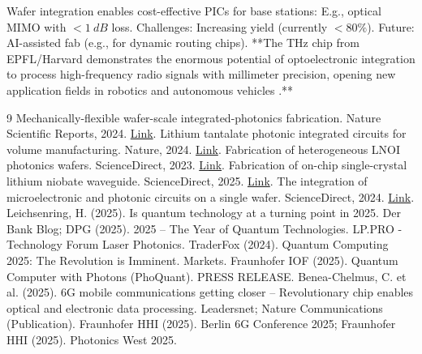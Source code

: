 	Wafer integration enables cost-effective PICs for base stations: E.g., optical MIMO with $<\SI{1}{dB}$ loss. Challenges: Increasing yield (currently $<80\%$). Future: AI-assisted fab (e.g., for dynamic routing chips). **The THz chip from EPFL/Harvard demonstrates the enormous potential of optoelectronic integration to process high-frequency radio signals with millimeter precision, opening new application fields in robotics and autonomous vehicles \cite{thz_epfl}.**
	
	\begin{thebibliography}{9}
		 Mechanically-flexible wafer-scale integrated-photonics fabrication. Nature Scientific Reports, 2024. \href{https://www.nature.com/articles/s41598-024-61055-w}{Link}.
		 Lithium tantalate photonic integrated circuits for volume manufacturing. Nature, 2024. \href{https://www.nature.com/articles/s41586-024-07369-1}{Link}.
		 Fabrication of heterogeneous LNOI photonics wafers. ScienceDirect, 2023. \href{https://www.sciencedirect.com/science/article/abs/pii/S0169433223003422}{Link}.
		 Fabrication of on-chip single-crystal lithium niobate waveguide. ScienceDirect, 2025. \href{https://www.sciencedirect.com/science/article/abs/pii/S0030399224016062}{Link}.
		 The integration of microelectronic and photonic circuits on a single wafer. ScienceDirect, 2024. \href{https://www.sciencedirect.com/science/article/pii/S2589965124000540}{Link}.
		 Leichsenring, H. (2025). Is quantum technology at a turning point in 2025. Der Bank Blog; DPG (2025). 2025 – The Year of Quantum Technologies. LP.PRO - Technology Forum Laser Photonics.
		 TraderFox (2024). Quantum Computing 2025: The Revolution is Imminent. Markets.
		 Fraunhofer IOF (2025). Quantum Computer with Photons (PhoQuant). PRESS RELEASE.
		 Benea-Chelmus, C. et al. (2025). 6G mobile communications getting closer – Revolutionary chip enables optical and electronic data processing. Leadersnet; Nature Communications (Publication).
		 Fraunhofer HHI (2025). Berlin 6G Conference 2025; Fraunhofer HHI (2025). Photonics West 2025.
	\end{thebibliography}
	